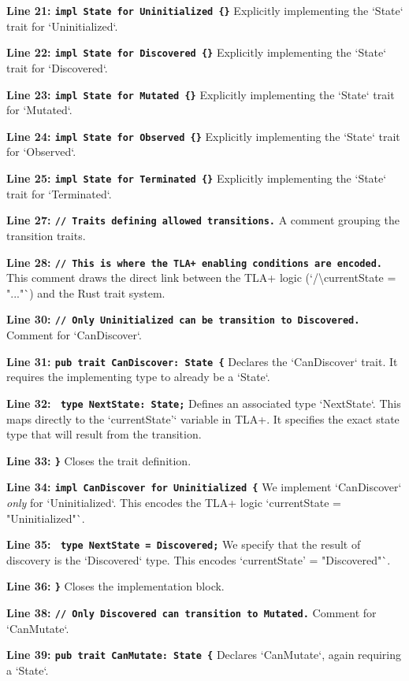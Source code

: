 \textbf{Line 21: \texttt{impl State for Uninitialized \{\}}}
Explicitly implementing the `State` trait for `Uninitialized`.

\textbf{Line 22: \texttt{impl State for Discovered \{\}}}
Explicitly implementing the `State` trait for `Discovered`.

\textbf{Line 23: \texttt{impl State for Mutated \{\}}}
Explicitly implementing the `State` trait for `Mutated`.

\textbf{Line 24: \texttt{impl State for Observed \{\}}}
Explicitly implementing the `State` trait for `Observed`.

\textbf{Line 25: \texttt{impl State for Terminated \{\}}}
Explicitly implementing the `State` trait for `Terminated`.

\textbf{Line 27: \texttt{// Traits defining allowed transitions.}}
A comment grouping the transition traits.

\textbf{Line 28: \texttt{// This is where the TLA+ enabling conditions are encoded.}}
This comment draws the direct link between the TLA+ logic (`/\textbackslash currentState = "..."`) and the Rust trait system.

\textbf{Line 30: \texttt{// Only Uninitialized can be transition to Discovered.}}
Comment for `CanDiscover`.

\textbf{Line 31: \texttt{pub trait CanDiscover: State \{}}
Declares the `CanDiscover` trait. It requires the implementing type to already be a `State`.

\textbf{Line 32: \texttt{    type NextState: State;}}
Defines an associated type `NextState`. This maps directly to the `currentState'` variable in TLA+. It specifies the exact state type that will result from the transition.

\textbf{Line 33: \texttt{\}}}
Closes the trait definition.

\textbf{Line 34: \texttt{impl CanDiscover for Uninitialized \{}}
We implement `CanDiscover` \textit{only} for `Uninitialized`. This encodes the TLA+ logic `currentState = "Uninitialized"`.

\textbf{Line 35: \texttt{    type NextState = Discovered;}}
We specify that the result of discovery is the `Discovered` type. This encodes `currentState' = "Discovered"`.

\textbf{Line 36: \texttt{\}}}
Closes the implementation block.

\textbf{Line 38: \texttt{// Only Discovered can transition to Mutated.}}
Comment for `CanMutate`.

\textbf{Line 39: \texttt{pub trait CanMutate: State \{}}
Declares `CanMutate`, again requiring a `State`.

